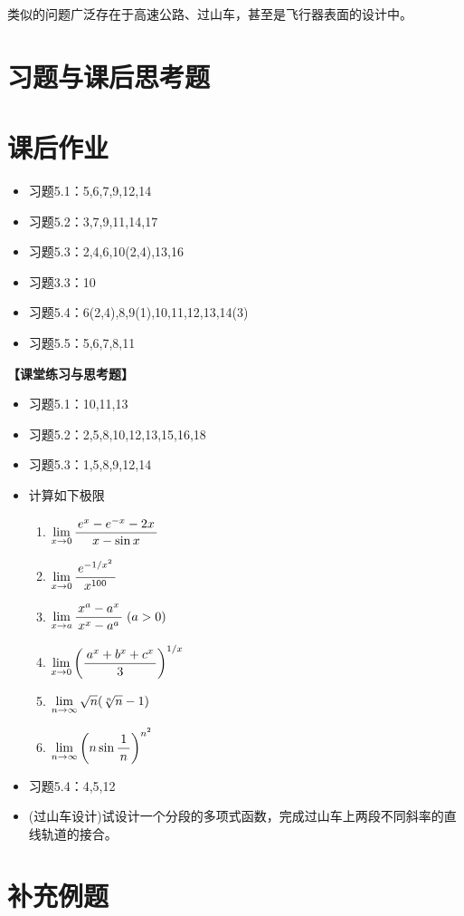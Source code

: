 类似的问题广泛存在于高速公路、过山车，甚至是飞行器表面的设计中。

\newpage

\section*{习题与课后思考题}

\section*{课后作业}

\begin{itemize}
  \item 习题5.1：5,6,7,9,12,14
  \item 习题5.2：3,7,9,11,14,17
  \item 习题5.3：2,4,6,10(2,4),13,16
  \item 习题3.3：10
  \item 习题5.4：6(2,4),8,9(1),10,11,12,13,14(3)
  \item 习题5.5：5,6,7,8,11
\end{itemize}

{\bf 【课堂练习与思考题】}

\begin{itemize}
  \item 习题5.1：10,11,13
  \item 习题5.2：2,5,8,10,12,13,15,16,18
  \item 习题5.3：1,5,8,9,12,14
  \item 计算如下极限
  	\begin{enumerate}
	  \item $\lim\limits_{x\to{0}}\displaystyle\frac{\,{e^x-e^{-x}-2x}\,}{\,{x-\sin x}\,}$ 
	  \item $\lim\limits_{x\to{0}}\displaystyle\frac{\,{e^{-1/x^2}}\,}{\,{x^{100}}\,}$ 
	  \item $\lim\limits_{x\to{a}}\displaystyle\frac{\,{x^a-a^x}\,}{\,{x^x-a^a}\,}\;(a>0)$ 
	  \item $\lim\limits_{x\to{0}}\left(\displaystyle\frac{\,{a^x+b^x+c^x}\,}{\,{3}\,}\right)^{1/x}$ 
	  \item $\lim\limits_{n\to\infty}\sqrt{n}(\sqrt[n]{n}-1)$ 
	  \item $\lim\limits_{n\to\infty}\left(n\sin\displaystyle\frac{\,{1}\,}{\,{n}\,}\right)^{n^2}$
	\end{enumerate}	
  \item 习题5.4：4,5,12
  \item (过山车设计)试设计一个分段的多项式函数，完成过山车上两段不同斜率的直线轨道的接合。
\end{itemize}

\newpage

\section*{补充例题}

